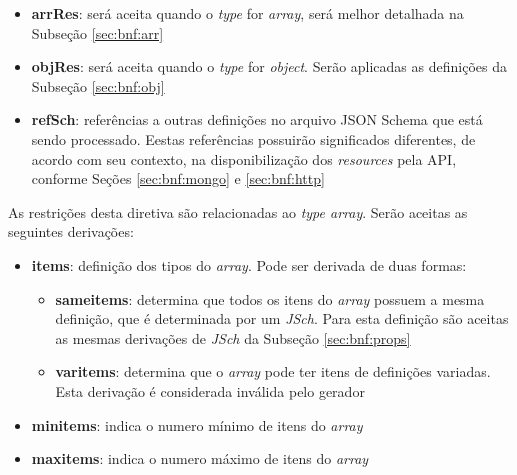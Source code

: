 \begin{itemize}
    \item \textbf{arrRes}: será aceita quando o \textit{type} for \textit{array}, será melhor detalhada na Subseção \ref{sec:bnf:arr}

    \item \textbf{objRes}: será aceita quando o \textit{type} for \textit{object}. Serão aplicadas as definições da Subseção \ref{sec:bnf:obj}

    \item \textbf{refSch}: referências a outras definições no arquivo JSON Schema que está sendo processado. Eestas referências possuirão significados diferentes, de acordo com seu contexto, na disponibilização dos \textit{resources} pela API, conforme Seções \ref{sec:bnf:mongo} e \ref{sec:bnf:http}
\end{itemize}

\label{sec:bnf:arr}
As restrições desta diretiva são relacionadas ao \textit{type array}. Serão aceitas as seguintes derivações:
\begin{itemize}
    \item \textbf{items}: definição dos tipos do \textit{array}. Pode ser derivada de duas formas:
    \begin{itemize}
        \item \textbf{sameitems}: determina que todos os itens do \textit{array} possuem a mesma definição, que é determinada por um \textit{JSch}. Para esta definição são aceitas as mesmas derivações de \textit{JSch} da Subseção \ref{sec:bnf:props}

        \item \textbf{varitems}: determina que o \textit{array} pode ter itens de definições variadas. Esta derivação é considerada inválida pelo gerador

    \end{itemize}


    \item \textbf{minitems}: indica o numero mínimo de itens do \textit{array}

    \item \textbf{maxitems}: indica o numero máximo de itens do \textit{array}
\end{itemize}


